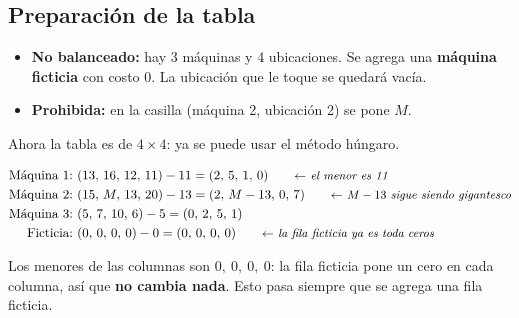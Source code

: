 \documentclass[11pt,a4paper]{article}
\let\pasobase\paso
\renewcommand{\paso}[1]{\needspace{7\baselineskip}\pasobase{#1}}
\newcommand{\rejilla}[3]{%
  \foreach \i in {2,...,#2}{\foreach \j in {2,...,#3}{%
    \draw[gray!55, thin] (#1-\i-\j.north west) rectangle (#1-\i-\j.south east);}}%
  \draw[thick] (#1-2-2.north west) rectangle (#1-#2-#3.south east);}
\newcommand{\sfila}[3]{\begin{pgfonlayer}{background}\fill[gray!16] (#1-#2-2.north west) rectangle (#1-#2-#3.south east);\end{pgfonlayer}}
\newcommand{\cajaM}{\textbf{M}}
\begin{document}
\subsection*{Preparación de la tabla}
\begin{minipage}[c]{0.44\textwidth}
\begin{itemize}[itemsep=2pt, leftmargin=*]
  \item \textbf{No balanceado:} hay 3 máquinas y 4 ubicaciones. Se agrega una \textbf{máquina ficticia} con
        costo 0. La ubicación que le toque se quedará vacía.
  \item \textbf{Prohibida:} en la casilla (máquina 2, ubicación 2) se pone $M$.
\end{itemize}
\end{minipage}\hfill
\begin{minipage}[c]{0.54\textwidth}
\centering
{}
\end{minipage}

\medskip
Ahora la tabla es de $4 \times 4$: ya se puede usar el método húngaro.

\begin{align*}
\text{Máquina 1:}&\ (13,\,16,\,12,\,11) - 11 = (2,\,5,\,1,\,0) \nota{el menor es 11}\\
\text{Máquina 2:}&\ (15,\,M,\,13,\,20) - 13 = (2,\,M-13,\,0,\,7) \nota{$M - 13$ sigue siendo gigantesco}\\
\text{Máquina 3:}&\ (5,\,7,\,10,\,6) - 5 = (0,\,2,\,5,\,1)\\
\text{Ficticia:}&\ (0,\,0,\,0,\,0) - 0 = (0,\,0,\,0,\,0) \nota{la fila ficticia ya es toda ceros}
\end{align*}

Los menores de las columnas son $0,\ 0,\ 0,\ 0$: la fila ficticia pone un cero en cada columna, así que
\textbf{no cambia nada}. Esto pasa siempre que se agrega una fila ficticia.
\end{document}
